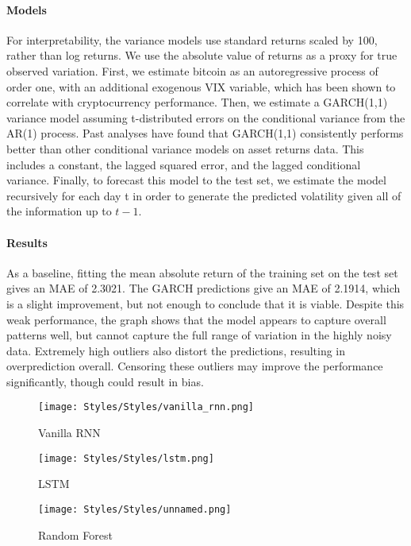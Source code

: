 \documentclass{article}
\begin{document}
\paragraph{Models}
For interpretability, the variance models use standard returns scaled by 100, rather than log returns. We use the absolute value of returns as a proxy for true observed variation. First, we estimate bitcoin as an autoregressive process of order one, with an additional exogenous VIX variable, which has been shown to correlate with cryptocurrency performance. Then, we estimate a GARCH(1,1) variance model assuming t-distributed errors on the conditional variance from the AR(1) process. Past analyses have found that GARCH(1,1) consistently performs better than other conditional variance models on asset returns data. This includes a constant, the lagged squared error, and the lagged conditional variance. Finally, to forecast this model to the test set, we estimate the model recursively for each day t in order to generate the predicted volatility given all of the information up to $t-1$.

\paragraph{Results}
As a baseline, fitting the mean absolute return of the training set on the test set gives an MAE of 2.3021. The GARCH predictions give an MAE of 2.1914, which is a slight improvement, but not enough to conclude that it is viable. Despite this weak performance, the graph shows that the model appears to capture overall patterns well, but cannot capture the full range of variation in the highly noisy data. Extremely high outliers also distort the predictions, resulting in overprediction overall. Censoring these outliers may improve the performance significantly, though could result in bias.


\begin{figure} [H]
    \centering
    \texttt{[image: Styles/Styles/vanilla\_rnn.png]}
    \caption{Vanilla RNN}
    \label{fig:enter-label}
\end{figure}

\begin{figure}
    \centering
    \texttt{[image: Styles/Styles/lstm.png]}
    \caption{LSTM}
    \label{fig:enter-label}
\end{figure}

\begin{figure} 
    \centering
    \texttt{[image: Styles/Styles/unnamed.png]}
    \caption{Random Forest}
    \label{fig:enter-label}
\end{figure}
\end{document}
